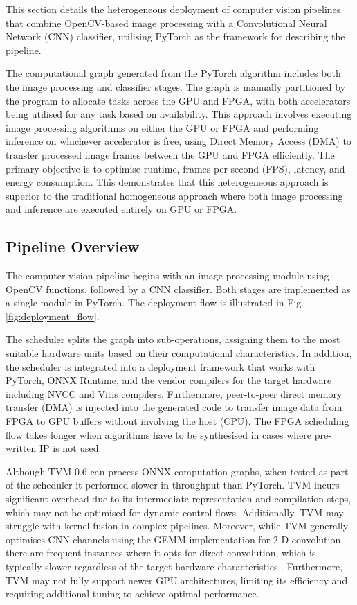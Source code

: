 \documentclass[]{spie}  %
\begin{document}
This section details the heterogeneous deployment of computer vision pipelines that combine OpenCV-based image processing with a Convolutional Neural Network (CNN) classifier, utilising PyTorch as the framework for describing the pipeline. 

The computational graph generated from the PyTorch algorithm includes both the image processing and classifier stages. The graph is manually partitioned by the program to allocate tasks across the GPU and FPGA, with both accelerators being utilised for any task based on availability. This approach involves executing image processing algorithms on either the GPU or FPGA and performing inference on whichever accelerator is free, using Direct Memory Access (DMA) to transfer processed image frames between the GPU and FPGA efficiently. The primary objective is to optimise runtime, frames per second (FPS), latency, and energy consumption. This demonstrates that this heterogeneous approach is superior to the traditional homogeneous approach where both image processing and inference are executed entirely on GPU or FPGA.

\subsection{Pipeline Overview}

The computer vision pipeline begins with an image processing module using OpenCV functions, followed by a CNN classifier. Both stages are implemented as a single module in PyTorch. The deployment flow is illustrated in Fig. \ref{fig:deployment_flow}.

The scheduler splits the graph into sub-operations, assigning them to the most suitable hardware units based on their computational characteristics. In addition, the scheduler is integrated into a deployment framework that works with PyTorch, ONNX Runtime, and the vendor compilers for the target hardware including NVCC and Vitis compilers. Furthermore, peer-to-peer direct memory transfer (DMA) is injected into the generated code to transfer image data from FPGA to GPU buffers without involving the host (CPU). The FPGA scheduling flow takes longer when algorithms have to be synthesised in cases where pre-written IP is not used.

Although TVM 0.6 can process ONNX computation graphs, when tested as part of the scheduler it performed slower in throughput than PyTorch. TVM incurs significant overhead due to its intermediate representation and compilation steps, which may not be optimised for dynamic control flows. Additionally, TVM may struggle with kernel fusion in complex pipelines. Moreover, while TVM generally optimises CNN channels using the GEMM implementation for 2-D convolution, there are frequent instances where it opts for direct convolution, which is typically slower regardless of the target hardware characteristics \cite{9042000}. Furthermore, TVM may not fully support newer GPU architectures, limiting its efficiency and requiring additional tuning to achieve optimal performance.
\end{document}
